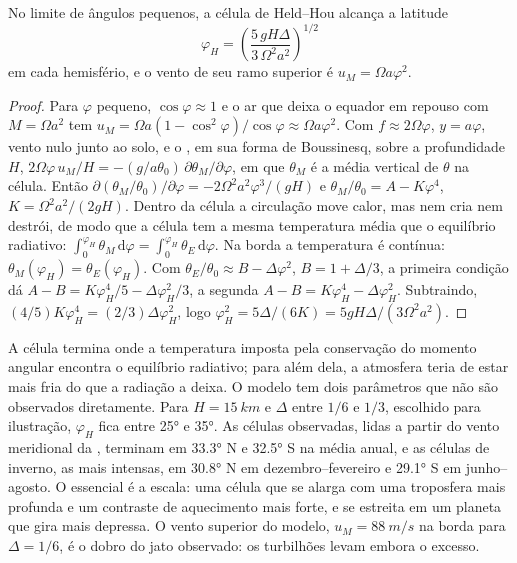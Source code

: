 \begin{theorem}\label{thm:b3:atmospheric-dynamics:held-hou}
No limite de ângulos pequenos, a célula de Held--Hou alcança a latitude
\[
\varphi_H = \left(\frac{5\,gH\Delta}{3\,\Omega^2a^2}\right)^{1/2}
\]
em cada hemisfério, e o vento de seu ramo superior é $u_M = \Omega
a\varphi^2$.
\end{theorem}

\begin{proof}
Para $\varphi$ pequeno, $\cos\varphi \approx 1$ e o ar que deixa o equador em
repouso com $M = \Omega a^2$ tem $u_M = \Omega a(1 - \cos^2\varphi)/\cos\varphi
\approx \Omega a\varphi^2$. Com $f \approx 2\Omega\varphi$, $y = a\varphi$,
vento nulo junto ao solo, e o , em sua forma de Boussinesq, sobre a
profundidade $H$, $2\Omega\varphi\,u_M/H = -(g/a\theta_0)\,\partial\theta_M/
\partial\varphi$, em que $\theta_M$ é a média vertical de $\theta$ na
célula. Então $\partial(\theta_M/\theta_0)/\partial\varphi = -2\Omega^2a^2
\varphi^3/(gH)$ e $\theta_M/\theta_0 = A - K\varphi^4$, $K = \Omega^2a^2/
(2gH)$. Dentro da célula a circulação move calor, mas nem cria nem
destrói, de modo que a célula tem a mesma temperatura média que o equilíbrio
radiativo: $\int_0^{\varphi_H}\theta_M\,\mathrm d\varphi = \int_0^{\varphi_H}
\theta_E\,\mathrm d\varphi$. Na borda a temperatura é contínua:
$\theta_M(\varphi_H) = \theta_E(\varphi_H)$. Com $\theta_E/\theta_0 \approx
B - \Delta\varphi^2$, $B = 1 + \Delta/3$, a primeira condição dá $A - B =
K\varphi_H^4/5 - \Delta\varphi_H^2/3$, a segunda $A - B = K\varphi_H^4 -
\Delta\varphi_H^2$. Subtraindo, $(4/5)K\varphi_H^4 = (2/3)\Delta
\varphi_H^2$, logo $\varphi_H^2 = 5\Delta/(6K) = 5gH\Delta/(3\Omega^2a^2)$.
\end{proof}

A célula termina onde a temperatura imposta pela conservação do momento angular
encontra o equilíbrio radiativo; para além dela, a atmosfera teria de
estar mais fria do que a radiação a deixa. O modelo tem dois parâmetros que não são
observados diretamente. Para $H = \qty{15}{km}$ e $\Delta$ entre $1/6$ e
$1/3$, escolhido para ilustração, $\varphi_H$ fica entre \ang{25} e \ang{35}. As
células observadas, lidas a partir do vento meridional da , terminam em
\ang{33.3} N e \ang{32.5} S na média anual, e as células de inverno,
as mais intensas, em \ang{30.8} N em dezembro--fevereiro e \ang{29.1} S em
junho--agosto. O essencial é a escala: uma célula que se alarga com uma
troposfera mais profunda e um contraste de aquecimento mais forte, e se estreita em um
planeta que gira mais depressa. O vento superior do modelo, $u_M =
\qty{88}{m/s}$ na borda para $\Delta = 1/6$, é o dobro do jato observado:
os turbilhões levam embora o excesso.

